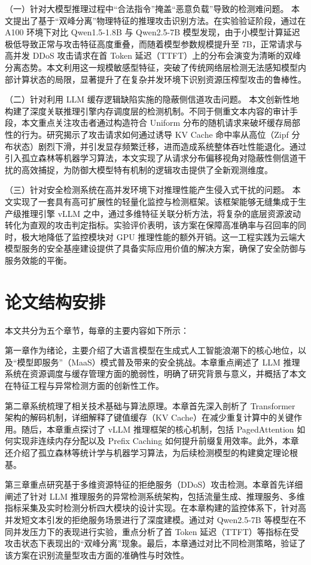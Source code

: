 \documentclass[master, vlined]{DissertUESTC}
\begin{document}
	（一）针对大模型推理过程中“合法指令”掩盖“恶意负载”导致的检测难问题。
	本文提出了基于“双峰分离”物理特征的推理攻击识别方法。在实验验证阶段，通过在 A100 环境下对比 Qwen1.5-1.8B 与 Qwen2.5-7B 模型发现，由于小模型计算延迟极低导致正常与攻击特征高度重叠，而随着模型参数规模提升至 7B，正常请求与高并发 DDoS 攻击请求在首 Token 延迟（TTFT）上的分布会演变为清晰的双峰分离态势。本文利用这一规模敏感型特征，突破了传统网络层检测无法感知模型内部计算状态的局限，显著提升了在复杂并发环境下识别资源压榨型攻击的鲁棒性。

	（二）针对利用 LLM 缓存逻辑缺陷实施的隐蔽侧信道攻击问题。
	本文创新性地构建了深度关联推理引擎内存调度层的检测机制。不同于侧重文本内容的审计手段，本文重点关注攻击者通过构造符合 Uniform 分布的随机请求来破坏缓存局部性的行为。研究揭示了攻击请求如何通过诱导 KV Cache 命中率从高位（Zipf 分布状态）剧烈下滑，并引发显存频繁迁移，进而造成系统整体吞吐性能退化。通过引入孤立森林等机器学习算法，本文实现了从请求分布偏移视角对隐蔽性侧信道干扰的高效捕捉，为防御大模型特有机制的逻辑攻击提供了全新观测维度。

	（三）针对安全检测系统在高并发环境下对推理性能产生侵入式干扰的问题。
	本文实现了一套具有高可扩展性的轻量化监控与检测框架。该框架能够无缝集成于生产级推理引擎 vLLM 之中，通过多维特征关联分析方法，将复杂的底层资源波动转化为直观的攻击判定指标。实验评价表明，该方案在保障高准确率与召回率的同时，极大地降低了监控模块对 GPU 推理性能的额外开销。这一工程实践为云端大模型服务的安全基座建设提供了具备实际应用价值的解决方案，确保了安全防御与服务效能的平衡。
	
	\section{论文结构安排}

	本文共分为五个章节，每章的主要内容如下所示：

	第一章作为绪论，主要介绍了大语言模型在生成式人工智能浪潮下的核心地位，以及“模型即服务”（MaaS）模式普及带来的安全挑战。本章重点阐述了 LLM 推理系统在资源调度与缓存管理方面的脆弱性，明确了研究背景与意义，并概括了本文在特征工程与异常检测方面的创新性工作。

	第二章系统梳理了相关技术基础与算法原理。本章首先深入剖析了 Transformer 架构的解码机制，详细解释了键值缓存（KV Cache）在减少重复计算中的关键作用。随后，本章重点探讨了 vLLM 推理框架的核心机制，包括 PagedAttention 如何实现非连续内存分配以及 Prefix Caching 如何提升前缀复用效率。此外，本章还介绍了孤立森林等统计学与机器学习算法，为后续检测模型的构建奠定理论根基。

	第三章重点研究基于多维资源特征的拒绝服务（DDoS）攻击检测。本章首先详细阐述了针对 LLM 推理服务的异常检测系统架构，包括流量生成、推理服务、多维指标采集及实时检测分析四大模块的设计实现。在本章构建的监控体系下，针对高并发短文本引发的拒绝服务场景进行了深度建模。通过对 Qwen2.5-7B 等模型在不同并发压力下的表现进行实验，重点分析了首 Token 延迟（TTFT）等指标在受攻击状态下表现出的“双峰分离”现象。最后，本章通过对比不同检测策略，验证了该方案在识别流量型攻击方面的准确性与时效性。
\end{document}
